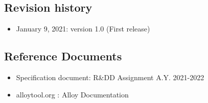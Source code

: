 \subsection{Revision history}
\begin{itemize}
    \item January 9, 2021: version 1.0 (First release)
\end{itemize}

\subsection{Reference Documents}
\begin{itemize}
    \item Specification document: R\&DD Assignment A.Y. 2021-2022
    \item alloytool.org : Alloy Documentation
\end{itemize}

